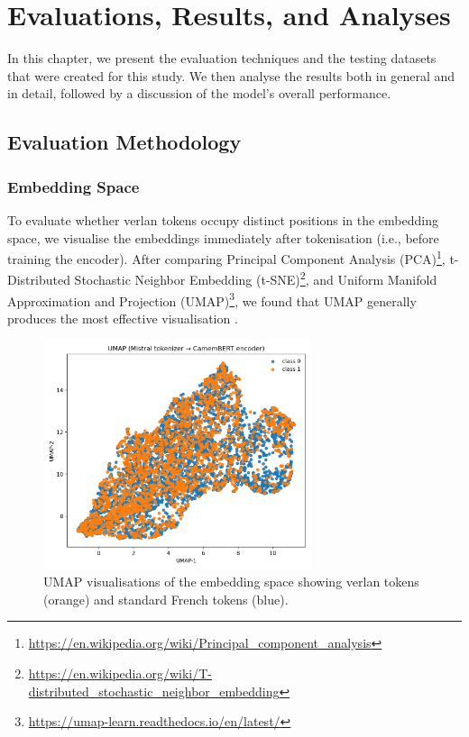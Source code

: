 \documentclass[12pt]{article}
\begin{document}

\section{Evaluations, Results, and Analyses}

In this chapter, we present the evaluation techniques and the testing datasets that were created for this study. 
We then analyse the results both in general and in detail, followed by a discussion of the model's overall performance.

\subsection{Evaluation Methodology}

\subsubsection{Embedding Space}
To evaluate whether verlan tokens occupy distinct positions in the embedding space, 
we visualise the embeddings immediately after tokenisation (i.e., before training the encoder). 
After comparing Principal Component Analysis (PCA)\footnote{\url{https://en.wikipedia.org/wiki/Principal_component_analysis}}, 
t-Distributed Stochastic Neighbor Embedding (t-SNE)\footnote{\url{https://en.wikipedia.org/wiki/T-distributed_stochastic_neighbor_embedding}}, 
and Uniform Manifold Approximation and Projection (UMAP)\footnote{\url{https://umap-learn.readthedocs.io/en/latest/}}, 
we found that UMAP generally produces the most effective visualisation \cite{pearson1901pca,maaten2008tsne,mcinnes2018umap}.

\begin{figure}[htbp]
    \centering
    \includegraphics[width=0.7\textwidth]{figures/mistral_bert_umap.png}
    \caption{UMAP visualisations of the embedding space showing verlan tokens (orange) and standard French tokens (blue).}
    \label{fig:umap_comparison}
\end{figure}
\end{document}
